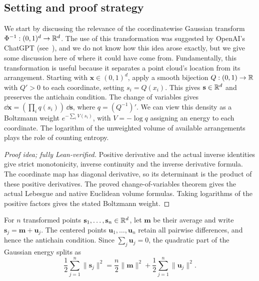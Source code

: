 \documentclass[11pt,letterpaper]{article}
\begin{document}
\subsection{Setting and proof strategy}


We start by discussing the relevance of the coordinatewise Gaussian transform $\Phi^{-1}:(0,1)^d\to\mathbb R^{d}$. The use of this transformation was suggested by OpenAI's ChatGPT (see~), and we do not know how this idea arose exactly, but we give some discussion here of where it could have come from. Fundamentally, this transformation is useful because it separates a point cloud's location from its arrangement. Starting with $\mathbf x\in(0,1)^d$, apply a smooth bijection $Q:(0,1)\to\mathbb R$ with $Q'>0$ to each coordinate, setting $s_i=Q(x_i)$. This gives $\mathbf s\in\mathbb R^d$ and preserves the antichain condition. The change of variables gives $\dd\mathbf x=(\prod_iq(s_i))\,\dd\mathbf s$, where $q=(Q^{-1})'$. We can view this density as a Boltzmann weight $e^{-\sum_iV(s_i)}$, with $V=-\log q$ assigning an energy to each coordinate. The logarithm of the unweighted volume of available arrangements plays the role of counting entropy.

\begin{proof}[Proof idea; fully Lean-verified]
Positive derivative and the actual inverse identities give strict monotonicity, inverse continuity and the inverse derivative formula. The coordinate map has diagonal derivative, so its determinant is the product of these positive derivatives. The proved change-of-variables theorem gives the actual Lebesgue and native Euclidean volume formulas. Taking logarithms of the positive factors gives the stated Boltzmann weight.
\end{proof}


For $n$ transformed points $\mathbf s_1,\ldots,\mathbf s_n\in\mathbb R^d$, let $\mathbf m$ be their average and write $\mathbf s_j=\mathbf m+\mathbf u_j$. The centered points $\mathbf u_1,\ldots,\mathbf u_n$ retain all pairwise differences, and hence the antichain condition. Since $\sum_j\mathbf u_j=0$, the quadratic part of the Gaussian energy splits as
\[
      \frac12\sum_{j=1}^n\|\mathbf s_j\|^2=\frac n2\|\mathbf m\|^2+\frac12\sum_{j=1}^n\|\mathbf u_j\|^2.
\]
\end{document}
